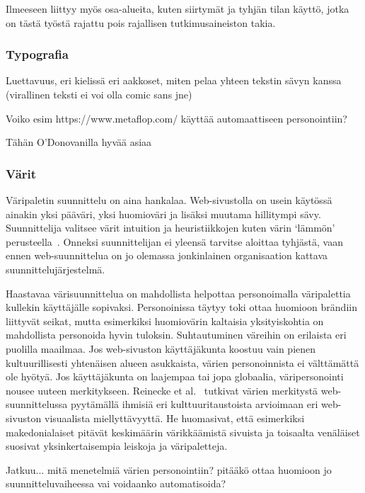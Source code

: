 \documentclass[finnish, 12pt, a4paper, elec, utf8, a-1b, online]{aaltothesis}
\begin{document}
Ilmeeseen liittyy myös osa-alueita, kuten siirtymät ja tyhjän tilan käyttö,
jotka on tästä työstä rajattu pois rajallisen tutkimusaineiston takia.

\subsubsection{Typografia}

Luettavuus, eri kielissä eri aakkoset, miten pelaa yhteen tekstin sävyn kanssa
(virallinen teksti ei voi olla comic sans jne)

Voiko esim https://www.metaflop.com/ käyttää automaattiseen personointiin?

Tähän O'Donovanilla hyvää asiaa

\subsubsection{Värit}

Väripaletin suunnittelu on aina hankalaa. Web-sivustolla on usein käytössä
ainakin yksi pääväri, yksi huomioväri ja lisäksi muutama hillitympi sävy.
Suunnittelija valitsee värit intuition ja heuristiikkojen kuten värin `lämmön'
perusteella~\cite{odonovan_2015}. Onneksi suunnittelijan ei yleensä tarvitse
aloittaa tyhjästä, vaan ennen web-suunnittelua on jo olemassa jonkinlainen
organisaation kattava suunnittelujärjestelmä.

Haastavaa värisuunnittelua on mahdollista helpottaa personoimalla väripalettia
kullekin käyttäjälle sopivaksi. Personoinissa täytyy toki ottaa huomioon
brändiin liittyvät seikat, mutta esimerkiksi huomiovärin kaltaisia
yksityiskohtia on mahdollista personoida hyvin tuloksin. Suhtautuminen väreihin
on erilaista eri puolilla maailmaa. Jos web-sivuston käyttäjäkunta koostuu vain
pienen kultuurillisesti yhtenäisen alueen asukkaista, värien personoinnista ei
välttämättä ole hyötyä. Jos käyttäjäkunta on laajempaa tai jopa globaalia,
väripersonointi nousee uuteen merkitykseen. Reinecke et
al.~\cite{10.1145/2556288.2557052} tutkivat värien merkitystä web-suunnittelussa
pyytämällä ihmisiä eri kulttuuritaustoista arvioimaan eri web-sivuston
visuaalista miellyttävyyttä. He huomasivat, että esimerkiksi makedonialaiset
pitävät keskimäärin värikkäämistä sivuista ja toisaalta venäläiset suosivat
yksinkertaisempia leiskoja ja väripaletteja.

Jatkuu... mitä menetelmiä värien personointiin? pitääkö ottaa huomioon jo
suunnitteluvaiheessa vai voidaanko automatisoida?
\end{document}
